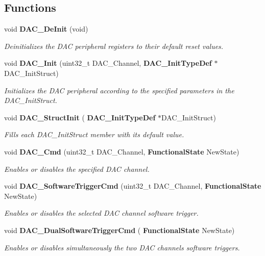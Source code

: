 \subsection*{Functions}
\begin{DoxyCompactItemize}
\item 
void \textbf{ D\+A\+C\+\_\+\+De\+Init} (void)
\begin{DoxyCompactList}\small\item\em Deinitializes the D\+AC peripheral registers to their default reset values. \end{DoxyCompactList}\item 
void \textbf{ D\+A\+C\+\_\+\+Init} (uint32\+\_\+t D\+A\+C\+\_\+\+Channel, \textbf{ D\+A\+C\+\_\+\+Init\+Type\+Def} $\ast$D\+A\+C\+\_\+\+Init\+Struct)
\begin{DoxyCompactList}\small\item\em Initializes the D\+AC peripheral according to the specified parameters in the D\+A\+C\+\_\+\+Init\+Struct. \end{DoxyCompactList}\item 
void \textbf{ D\+A\+C\+\_\+\+Struct\+Init} (\textbf{ D\+A\+C\+\_\+\+Init\+Type\+Def} $\ast$D\+A\+C\+\_\+\+Init\+Struct)
\begin{DoxyCompactList}\small\item\em Fills each D\+A\+C\+\_\+\+Init\+Struct member with its default value. \end{DoxyCompactList}\item 
void \textbf{ D\+A\+C\+\_\+\+Cmd} (uint32\+\_\+t D\+A\+C\+\_\+\+Channel, \textbf{ Functional\+State} New\+State)
\begin{DoxyCompactList}\small\item\em Enables or disables the specified D\+AC channel. \end{DoxyCompactList}\item 
void \textbf{ D\+A\+C\+\_\+\+Software\+Trigger\+Cmd} (uint32\+\_\+t D\+A\+C\+\_\+\+Channel, \textbf{ Functional\+State} New\+State)
\begin{DoxyCompactList}\small\item\em Enables or disables the selected D\+AC channel software trigger. \end{DoxyCompactList}\item 
void \textbf{ D\+A\+C\+\_\+\+Dual\+Software\+Trigger\+Cmd} (\textbf{ Functional\+State} New\+State)
\begin{DoxyCompactList}\small\item\em Enables or disables simultaneously the two D\+AC channels software triggers. \end{DoxyCompactList}\item 

\end{DoxyCompactItemize}
